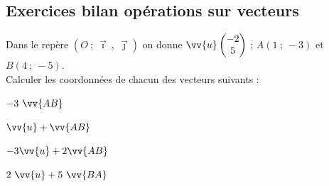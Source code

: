 \documentclass[main.tex]{subfiles}
\begin{document}
%	 

\newpage 
{}  
\pagestyle{scrheadings} %
\onehalfspacing

\subsection*{Exercices bilan opérations sur vecteurs}
\begin{example} \hfill 

\noindent Dans le repère 	$(O~;~ \vec{\imath}~,~ \vec{\jmath})$ on   donne  $\vv{u}\begin{pmatrix}
-2\\5
\end{pmatrix}$ ; $A(1~;~-3)$ et $B(4~;~-5)$.  \\
\noindent Calculer les coordonnées de chacun des vecteurs suivants :\\
\noindent \parbox{0.24\linewidth}{
$-3~\vv{AB}$\\
}
\parbox{0.24\linewidth}{
$\vv{u}+\vv{AB}$\\
}
\parbox{0.24\linewidth}{
$-3\vv{u}+2\vv{AB}$ \\
}
\parbox{0.24\linewidth}{
$2~\vv{u}+5~\vv{BA}$\\
} 
\end{example} 
\vfill 
%	
%	
\end{document}
